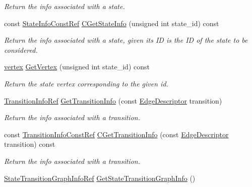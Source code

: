 \begin{DoxyCompactItemize}
\begin{DoxyCompactList}\small\item\em Return the info associated with a state. \end{DoxyCompactList}\item 
const \hyperlink{state__transition__graph_8hpp_a50240fded93adab729e333c2b8090a8b}{State\+Info\+Const\+Ref} \hyperlink{structStateTransitionGraph_a9ab334c1b537406817defc211cd20668}{C\+Get\+State\+Info} (unsigned int state\+\_\+id) const
\begin{DoxyCompactList}\small\item\em Return the info associated with a state, given its ID  is the ID of the state to be considered. \end{DoxyCompactList}\item 
\hyperlink{graph_8hpp_abefdcf0544e601805af44eca032cca14}{vertex} \hyperlink{structStateTransitionGraph_ac5686f613542a80be95c0a5bc888216d}{Get\+Vertex} (unsigned int state\+\_\+id) const
\begin{DoxyCompactList}\small\item\em Return the state vertex corresponding to the given id. \end{DoxyCompactList}\item 
\hyperlink{state__transition__graph_8hpp_a4406374514e349d48b6dd148b6977b53}{Transition\+Info\+Ref} \hyperlink{structStateTransitionGraph_a5c3eccee5a4b0b87a416a8829f7a96d7}{Get\+Transition\+Info} (const \hyperlink{graph_8hpp_a9eb9afea34e09f484b21f2efd263dd48}{Edge\+Descriptor} transition)
\begin{DoxyCompactList}\small\item\em Return the info associated with a transition. \end{DoxyCompactList}\item 
const \hyperlink{state__transition__graph_8hpp_a64af31867580dfd7aed5d8b7d93062ae}{Transition\+Info\+Const\+Ref} \hyperlink{structStateTransitionGraph_a98cdb3dd6dbe46e3b19ef361d1c31e45}{C\+Get\+Transition\+Info} (const \hyperlink{graph_8hpp_a9eb9afea34e09f484b21f2efd263dd48}{Edge\+Descriptor} transition) const
\begin{DoxyCompactList}\small\item\em Return the info associated with a transition. \end{DoxyCompactList}\item 
\hyperlink{state__transition__graph_8hpp_ad14dd7263de4e0bad3ad431954ad8252}{State\+Transition\+Graph\+Info\+Ref} \hyperlink{structStateTransitionGraph_add57cbde382f489d241dd24485435505}{Get\+State\+Transition\+Graph\+Info} ()

\end{DoxyCompactItemize}
